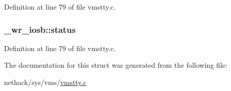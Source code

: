 Definition at line 79 of file vmstty.\+c.

\hypertarget{struct__wr__iosb_aaa8a8d695c1276f6aee864de35267537}{
\subsubsection[{status}]{ \+\_\+wr\+\_\+iosb\+::status}}\label{struct__wr__iosb_aaa8a8d695c1276f6aee864de35267537}


Definition at line 79 of file vmstty.\+c.



The documentation for this struct was generated from the following file\+:\begin{DoxyCompactItemize}
\item 
nethack/sys/vms/\hyperlink{vmstty_8c}{vmstty.\+c}\end{DoxyCompactItemize}
